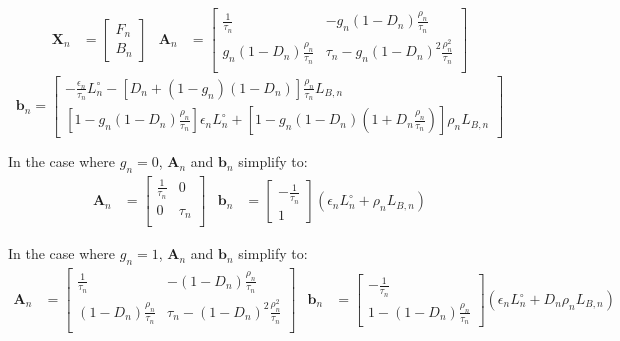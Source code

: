 \documentclass[11pt,a4paper]{article}
\begin{document}
\begin{align*}
	\bm{X}_n &=
		\begin{bmatrix}
			F_n \\ B_n
		\end{bmatrix}
	&
	\bm{A}_n &=
		\begin{bmatrix}
			\frac{1}{\tau_n} & - g_n \left(1 - D_n\right) \frac{\rho_n}{\tau_n} \\
			g_n \left(1 - D_n\right) \frac{\rho_n}{\tau_n} & \tau_n - g_n \left(1 - D_n\right)^2 \frac{\rho_n^2}{\tau_n} \\
		\end{bmatrix}
\end{align*}
\begin{equation*}
	\bm{b}_n = 
		\begin{bmatrix}
			- \frac{\epsilon_n}{\tau_n} L^\circ_n - \left[D_n + \left(1 - g_n\right)\left(1 - D_n\right)\right] \frac{\rho_n}{\tau_n} L_{B,n}\\[5pt]
			\left[1 - g_n \left(1 - D_n\right) \frac{\rho_n}{\tau_n}\right] \epsilon_n L^\circ_n + \left[1 - g_n \left( 1 - D_n \right) \left(1 + D_n \frac{\rho_n}{\tau_n}\right) \right] \rho_n L_{B,n}
		\end{bmatrix}
\end{equation*}

In the case where $ g_n = 0 $, $ \bm{A}_n $ and $ \bm{b}_n $ simplify to:
\begin{align*}
	\bm{A}_n &=
		\begin{bmatrix}
			\frac{1}{\tau_n} & 0 \\
			0 & \tau_n \\
		\end{bmatrix}
	&
	\bm{b}_n &= 
	\begin{bmatrix}
		-\frac{1}{\tau_n}\\[5pt]
		1
	\end{bmatrix} \left(\epsilon_n L^\circ_n + \rho_n L_{B,n}\right)
\end{align*}

In the case where $ g_n = 1 $, $ \bm{A}_n $ and $ \bm{b}_n $ simplify to:
\begin{align*}
	\bm{A}_n &=
		\begin{bmatrix}
			\frac{1}{\tau_n} & - \left(1 - D_n\right) \frac{\rho_n}{\tau_n} \\
			\left(1 - D_n\right) \frac{\rho_n}{\tau_n} & \tau_n - \left(1 - D_n\right)^2 \frac{\rho_n^2}{\tau_n} \\
		\end{bmatrix}
	&
	\bm{b}_n &= 
		\begin{bmatrix}
			-\frac{1}{\tau_n} \\[5pt]
			1 - \left(1 - D_n\right) \frac{\rho_n}{\tau_n}
		\end{bmatrix} \left(\epsilon_n L^\circ_n + D_n \rho_n L_{B,n}\right)
\end{align*}
\end{document}
